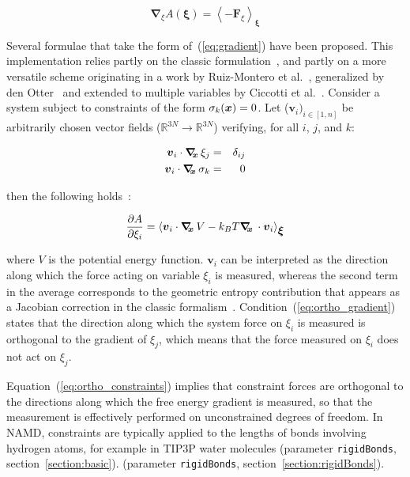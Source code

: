 \begin{equation}
  \label{eq:gradient}
  \bm{\nabla}_\xi A(\bm{\xi}) = \left\langle -\bm{F}_\xi \right\rangle_\bm{\xi}
\end{equation}

Several formulae that take the form of~(\ref{eq:gradient}) have been
proposed.  This implementation relies partly on the classic
formulation~\cite{Carter1989}, and partly on a more versatile scheme
originating in a work by Ruiz-Montero et al.~\cite{Ruiz-Montero1997},
generalized by den Otter~\cite{denOtter2000} and extended to multiple
variables by Ciccotti et al.~\cite{Ciccotti2005}.  Consider a system
subject to constraints of the form $\sigma_{k}({\mbox{\boldmath{$x$}}}) = 0$.  Let
($\bm{v}_{i})_{i\in[1,n]}$ be arbitrarily chosen vector fields
($\mathbb{R}^{3N}\rightarrow\mathbb{R}^{3N}$) verifying, for all $i$,
$j$, and $k$:

\begin{eqnarray}
\label{eq:ortho_gradient}
{\mbox{\boldmath{$v$}}}_{i} \cdot \mbox{\boldmath$\nabla_{\!\!x}\,$} \xi_{j}    & = & \delta_{ij}\\
\label{eq:ortho_constraints}
{\mbox{\boldmath{$v$}}}_{i} \cdot \mbox{\boldmath$\nabla_{\!\!x}\,$} \sigma_{k} & = & 0
\end{eqnarray}

then the following holds~\cite{Ciccotti2005}:

\begin{equation}
\label{eq:gradient_vector}
\frac{\partial A}{\partial \xi_{i}} = \left\langle {\mbox{\boldmath{$v$}}}_{i} \cdot \mbox{\boldmath$\nabla_{\!\!x}\,$} V
- k_B T \mbox{\boldmath$\nabla_{\!\!x}\,$} \cdot {\mbox{\boldmath{$v$}}}_{i} \right\rangle_{\mbox{\boldmath{$\xi$}}}
\end{equation}

where $V$ is the potential energy function.
$\bm{v}_{i}$ can be interpreted as the direction along which the force
acting on variable $\xi_{i}$ is measured, whereas the second term in the
average corresponds to the geometric entropy contribution that appears
as a Jacobian correction in the classic formalism~\cite{Carter1989}.
Condition~(\ref{eq:ortho_gradient}) states that the direction along
which the system force on $\xi_{i}$ is measured is orthogonal to the
gradient of $\xi_{j}$, which means that the force measured on $\xi_{i}$
does not act on $\xi_{j}$.

Equation~(\ref{eq:ortho_constraints}) implies that constraint forces
are orthogonal to the directions along which the free energy gradient is
measured, so that the measurement is effectively performed on unconstrained
degrees of freedom. In NAMD, constraints are typically applied to the lengths of
bonds involving hydrogen atoms, for example in TIP3P water molecules
(parameter \texttt{rigidBonds}, section~\ref{section:basic}).
(parameter \texttt{rigidBonds}, section~\ref{section:rigidBonds}).


